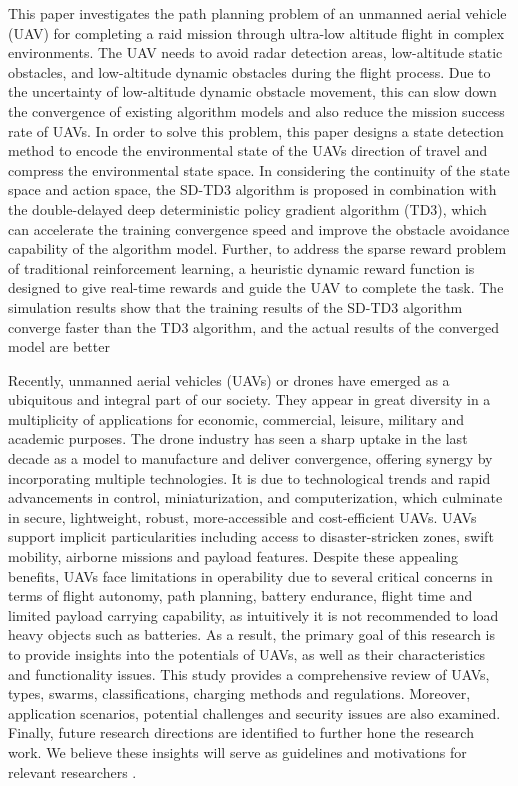 \documentclass[11pt,epsf,times]{article}
\begin{document}
This paper investigates the path planning problem of an unmanned aerial vehicle (UAV) for completing a raid mission through ultra-low altitude flight in complex environments. The UAV needs to avoid radar detection areas, low-altitude static obstacles, and low-altitude dynamic obstacles during the flight process. Due to the uncertainty of low-altitude dynamic obstacle movement, this can slow down the convergence of existing algorithm models and also reduce the mission success rate of UAVs. In order to solve this problem, this paper designs a state detection method to encode the environmental state of the UAVs direction of travel and compress the environmental state space. In considering the continuity of the state space and action space, the SD-TD3 algorithm is proposed in combination with the double-delayed deep deterministic policy gradient algorithm (TD3), which can accelerate the training convergence speed and improve the obstacle avoidance capability of the algorithm model. Further, to address the sparse reward problem of traditional reinforcement learning, a heuristic dynamic reward function is designed to give real-time rewards and guide the UAV to complete the task. The simulation results show that the training results of the SD-TD3 algorithm converge faster than the TD3 algorithm, and the actual results of the converged model are better \cite{machines2023}

Recently, unmanned aerial vehicles (UAVs) or drones have emerged as a ubiquitous and integral part of our society. They appear in great diversity in a multiplicity of applications for economic, commercial, leisure, military and academic purposes. The drone industry has seen a sharp uptake in the last decade as a model to manufacture and deliver convergence, offering synergy by incorporating multiple technologies. It is due to technological trends and rapid advancements in control, miniaturization, and computerization, which culminate in secure, lightweight, robust, more-accessible and cost-efficient UAVs. UAVs support implicit particularities including access to disaster-stricken zones, swift mobility, airborne missions and payload features. Despite these appealing benefits, UAVs face limitations in operability due to several critical concerns in terms of flight autonomy, path planning, battery endurance, flight time and limited payload carrying capability, as intuitively it is not recommended to load heavy objects such as batteries. As a result, the primary goal of this research is to provide insights into the potentials of UAVs, as well as their characteristics and functionality issues. This study provides a comprehensive review of UAVs, types, swarms, classifications, charging methods and regulations. Moreover, application scenarios, potential challenges and security issues are also examined. Finally, future research directions are identified to further hone the research work. We believe these insights will serve as guidelines and motivations for relevant researchers \cite{UAVPRACTICAL2023}.\\
\end{document}
